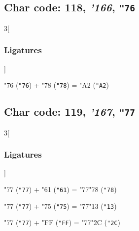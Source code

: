 \documentclass{article}
\newlength{\maxcharwidth}
\begin{document}
\subsection{Char code: 118, {\it'166}, {\tt"76}}
\label{char_118}


\begin{multicols}{3}[\subsubsection{Ligatures}]

{\testfont\char"76\noboundary} ({\tt"76}) + {\testfont\char"78\noboundary} ({\tt"78}) = {\testfont\char"A2\noboundary} ({\tt"A2}) 

\end{multicols}

\subsection{Char code: 119, {\it'167}, {\tt"77}}
\label{char_119}


\begin{multicols}{3}[\subsubsection{Ligatures}]

{\testfont\char"77\noboundary} ({\tt"77}) + {\testfont\char"61\noboundary} ({\tt"61}) = {\testfont\char"77\noboundary}{\testfont\char"78\noboundary} ({\tt"78}) 

{\testfont\char"77\noboundary} ({\tt"77}) + {\testfont\char"75\noboundary} ({\tt"75}) = {\testfont\char"77\noboundary}{\testfont\char"13\noboundary} ({\tt"13}) 

{\testfont\char"77\noboundary} ({\tt"77}) + {\testfont\char"FF\noboundary} ({\tt"FF}) = {\testfont\char"77\noboundary}{\testfont\char"2C\noboundary} ({\tt"2C}) 

\end{multicols}
\end{document}
